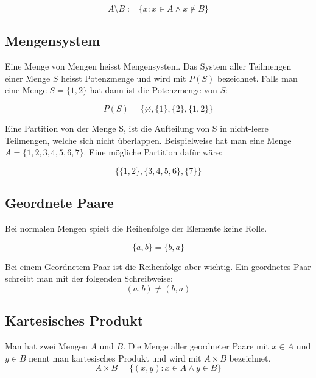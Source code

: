 \documentclass[12pt, a4paper, oneside]{article}
\begin{document}
\begin{equation}
  A \setminus B := \{x : x \in A \land x \notin B\}
\end{equation}

\subsection{Mengensystem}
Eine Menge von Mengen heisst Mengensystem. Das System aller Teilmengen einer Menge $S$ heisst Potenzmenge und wird mit $P(S)$ bezeichnet. Falls man eine Menge $S = \{1, 2\}$ hat dann ist die Potenzmenge von $S$:

\begin{equation}
  P(S) = \{\varnothing, \{1\}, \{2\}, \{1, 2\}\}
\end{equation}

Eine Partition von der Menge S, ist die Aufteilung von S in nicht-leere Teilmengen, welche sich nicht überlappen. Beispielweise hat man eine Menge $A = \{1, 2, 3, 4, 5, 6, 7\}$. Eine mögliche Partition dafür wäre:

\begin{equation}
  \{\{1, 2\}, \{3, 4, 5, 6\}, \{7\}\}
\end{equation}


\subsection{Geordnete Paare}
Bei normalen Mengen spielt die Reihenfolge der Elemente keine Rolle.

\begin{equation}
  \{a, b\} = \{b, a\}
\end{equation}

Bei einem Geordnetem Paar ist die Reihenfolge aber wichtig. Ein geordnetes Paar schreibt man mit der folgenden Schreibweise:
\begin{equation}
  (a, b) \neq (b, a)
\end{equation}


\subsection{Kartesisches Produkt}
Man hat zwei Mengen $A$ und $B$. Die Menge aller geordneter Paare mit $x \in A$ und $y \in B$ nennt man kartesisches Produkt und wird mit $A \times B$ bezeichnet.
\begin{equation}
  A \times B = \{(x, y) : x \in A \land y \in B\}
\end{equation}
\end{document}
